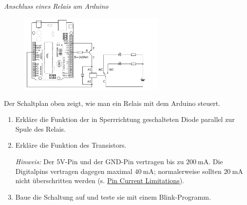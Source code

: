 \begin{aufgabe}\emph{Anschluss eines Relais am Arduino}
	\vspace{-0.5\baselineskip}
	\begin{figure}[H]
		\centering
		\includegraphics[width=0.65\textwidth]{./Zeichnungen/relais-schaltung-mit-arduino.png}
	\end{figure}
	\vspace{-0.5\baselineskip}
	Der Schaltplan oben zeigt, wie man ein Relais mit dem Arduino steuert.
	\begin{enumerate}[itemsep=0mm, parsep=0mm, label=\alph*)]
		\item Erkläre die Funktion der in Sperrrichtung geschalteten Diode parallel zur Spule des Relais.
		\item Erkläre die Funktion des Transistors.
		
		\emph{Hinweis:} Der 5V-Pin und der GND-Pin vertragen bis zu $\SI{200}{\milli\ampere}$. Die Digitalpins vertragen dagegen maximal $\SI{40}{\milli\ampere}$; normalerweise sollten $\SI{20}{\milli\ampere}$ nicht überschritten werden (s. \href{https://playground.arduino.cc/Main/ArduinoPinCurrentLimitations/}{Pin Current Limitations}).
		\item Baue die Schaltung auf und teste sie mit einem Blink-Programm.
	\end{enumerate}
\end{aufgabe}

